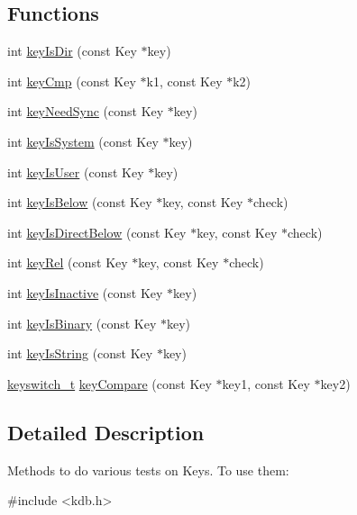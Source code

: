 \subsection*{Functions}
\begin{DoxyCompactItemize}
\item 
int \hyperlink{group__keytest_gac0a10c602d52a35f81347e8a32312017}{key\-Is\-Dir} (const Key $\ast$key)
\item 
int \hyperlink{group__keytest_gaf6e66e12fe04d535a5d1c8218ced803e}{key\-Cmp} (const Key $\ast$k1, const Key $\ast$k2)
\item 
int \hyperlink{group__keytest_gaf247df0de7aca04b32ef80e39ef12950}{key\-Need\-Sync} (const Key $\ast$key)
\item 
int \hyperlink{group__keytest_gafe49cfb61c2accb3073131c23a56fb14}{key\-Is\-System} (const Key $\ast$key)
\item 
int \hyperlink{group__keytest_ga373acc20c6209357045891f4b0c70041}{key\-Is\-User} (const Key $\ast$key)
\item 
int \hyperlink{group__keytest_ga03332b5d97c76a4fd2640aca4762b8df}{key\-Is\-Below} (const Key $\ast$key, const Key $\ast$check)
\item 
int \hyperlink{group__keytest_ga4f175aafd98948ce6c774f3bd92b72ca}{key\-Is\-Direct\-Below} (const Key $\ast$key, const Key $\ast$check)
\item 
int \hyperlink{group__keytest_ga6bb0f95ac34ce9c42d61bb35a76139d0}{key\-Rel} (const Key $\ast$key, const Key $\ast$check)
\item 
int \hyperlink{group__keytest_gaa25f699f592031c1a0abc1504d14e13e}{key\-Is\-Inactive} (const Key $\ast$key)
\item 
int \hyperlink{group__keytest_ga9526b371087564e43e3dff8ad0dac949}{key\-Is\-Binary} (const Key $\ast$key)
\item 
int \hyperlink{group__keytest_gaea7670778abd07fee0fe8ac12a149190}{key\-Is\-String} (const Key $\ast$key)
\item 
\hyperlink{group__key_ga91fb3178848bd682000958089abbaf40}{keyswitch\-\_\-t} \hyperlink{group__keytest_gab98168409d302fdb65692f6e26f17945}{key\-Compare} (const Key $\ast$key1, const Key $\ast$key2)
\end{DoxyCompactItemize}


\subsection{Detailed Description}
Methods to do various tests on Keys. To use them\-: 
\begin{DoxyCode}
\textcolor{preprocessor}{#include <kdb.h>}
\end{DoxyCode}
 

